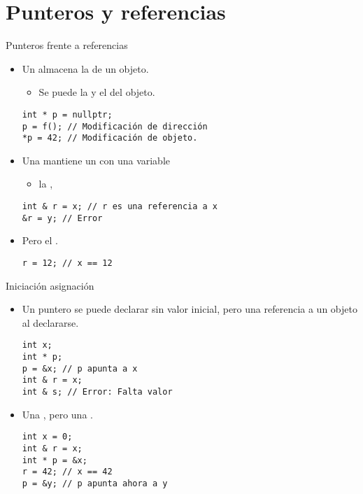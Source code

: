 \section{Punteros y referencias}

\begin{frame}[t,fragile]{Punteros frente a referencias}
\begin{itemize}
  \item Un  almacena la  de un objeto.
    \begin{itemize}
      \item Se puede  
            la  y el  del objeto.
    \end{itemize}
\begin{lstlisting}
int * p = nullptr; 
p = f(); // Modificación de dirección
*p = 42; // Modificación de objeto.
\end{lstlisting}

  \item Una  mantiene un  con una variable
    \begin{itemize}
      \item {} la , 
    \end{itemize}
\begin{lstlisting}
int & r = x; // r es una referencia a x
&r = y; // Error
\end{lstlisting}
      \item Pero  el .
\begin{lstlisting}
r = 12; // x == 12
\end{lstlisting}
\end{itemize}
\end{frame}

\begin{frame}[fragile]{Iniciación asignación}
\begin{itemize}
  \item Un puntero se puede declarar sin valor inicial, 
        pero una referencia 
        a un objeto al declararse.
\begin{lstlisting}
int x;
int * p;
p = &x; // p apunta a x
int & r = x;
int & s; // Error: Falta valor
\end{lstlisting}

  \item Una  , 
        pero una  .
\begin{lstlisting}
int x = 0;
int & r = x;
int * p = &x;
r = 42; // x == 42
p = &y; // p apunta ahora a y
\end{lstlisting}
\end{itemize}
\end{frame}
